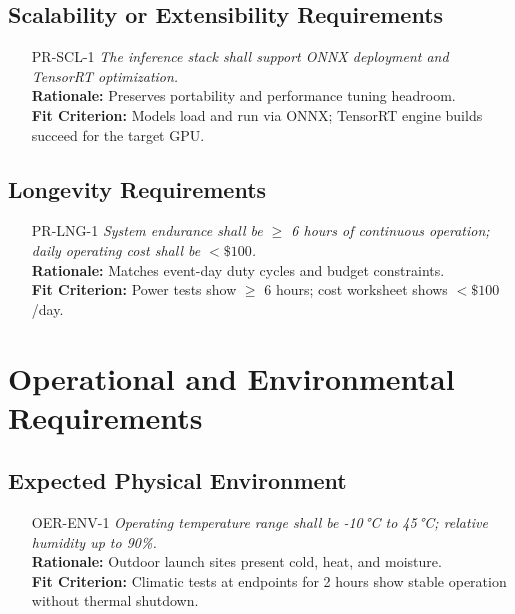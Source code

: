 \documentclass[12pt]{article}
\begin{document}
\subsection{Scalability or Extensibility Requirements}
\begin{itemize}[leftmargin=*]
  \item[PR-SCL-1] \emph{The inference stack shall support ONNX deployment and TensorRT
          optimization.}\\ \textbf{Rationale:} Preserves portability and performance
        tuning headroom.\\ \textbf{Fit Criterion:} Models load and run via ONNX;
        TensorRT engine builds succeed for the target GPU.
\end{itemize}

\subsection{Longevity Requirements}
\begin{itemize}[leftmargin=*]
  \item[PR-LNG-1] \emph{System endurance shall be $\geq$ 6 hours of continuous
          operation; daily operating cost shall be $<\$100$.}\\ \textbf{Rationale:}
        Matches event-day duty cycles and budget constraints.\\ \textbf{Fit Criterion:}
        Power tests show $\geq$ 6 hours; cost worksheet shows $<\$100$/day.
\end{itemize}

\section{Operational and Environmental Requirements}
\subsection{Expected Physical Environment}
\begin{itemize}[leftmargin=*]
  \item[OER-ENV-1] \emph{Operating temperature range shall be -10\,°C to 45\,°C;
          relative humidity up to 90\%.}\\ \textbf{Rationale:} Outdoor launch sites
        present cold, heat, and moisture.\\ \textbf{Fit Criterion:} Climatic tests at
        endpoints for 2 hours show stable operation without thermal shutdown.
\end{itemize}
\end{document}
